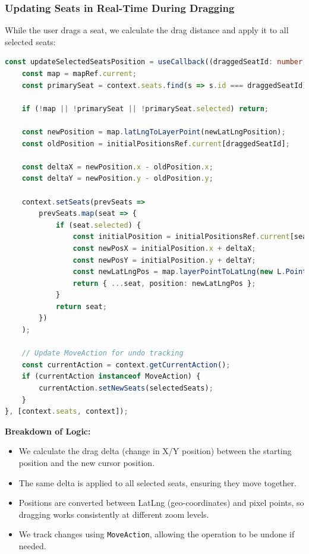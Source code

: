 \subsubsection{Updating Seats in Real-Time During Dragging}
While the user drags a seat, we calculate the drag distance and apply it to all selected seats:

\begin{lstlisting}[language=TypeScript, caption=Updating Seat Positions During Dragging, label=lst:seat-live-dragging]
const updateSelectedSeatsPosition = useCallback((draggedSeatId: number, newLatLngPosition: { lat: number; lng: number }) => {
    const map = mapRef.current;
    const primarySeat = context.seats.find(s => s.id === draggedSeatId);

    if (!map || !primarySeat || !primarySeat.selected) return;

    const newPosition = map.latLngToLayerPoint(newLatLngPosition);
    const oldPosition = initialPositionsRef.current[draggedSeatId];

    const deltaX = newPosition.x - oldPosition.x;
    const deltaY = newPosition.y - oldPosition.y;

    context.setSeats(prevSeats =>
        prevSeats.map(seat => {
            if (seat.selected) {
                const initialPosition = initialPositionsRef.current[seat.id];
                const newPosX = initialPosition.x + deltaX;
                const newPosY = initialPosition.y + deltaY;
                const newLatLngPos = map.layerPointToLatLng(new L.Point(newPosX, newPosY));
                return { ...seat, position: newLatLngPos };
            }
            return seat;
        })
    );

    // Update MoveAction for undo tracking
    const currentAction = context.getCurrentAction();
    if (currentAction instanceof MoveAction) {
        currentAction.setNewSeats(selectedSeats);
    }
}, [context.seats, context]);
\end{lstlisting}

\textbf{Breakdown of Logic:}
\begin{itemize}
    \item We calculate the drag delta (change in X/Y position) between the starting position and the new cursor position.
    \item The same delta is applied to all selected seats, ensuring they move together.
    \item Positions are converted between LatLng (geo-coordinates) and pixel points, so dragging works consistently at different zoom levels.
    \item We track changes using \texttt{MoveAction}, allowing the operation to be undone if needed.
\end{itemize}

